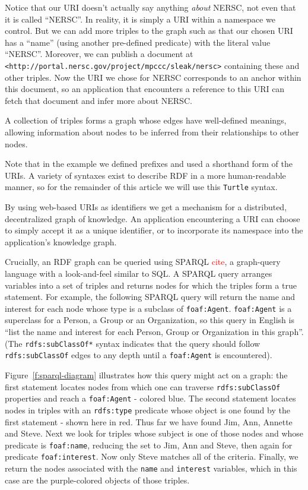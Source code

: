 Notice that our URI doesn't actually say anything \emph{about} NERSC, not even 
that it is called ``NERSC''. In reality, it is simply a URI within a 
namespace we control. But we can add more triples to the graph such as
that our chosen URI has a ``name'' (using another pre-defined predicate)
with the literal value ``NERSC''. Moreover, we can publish a document 
at \texttt{<http://portal.nersc.gov/project/mpccc/sleak/nersc>} containing 
these and other triples. Now the URI we chose for NERSC corresponds to an 
anchor within this document, so an application that encounters a reference 
to this URI can fetch that document and infer more about NERSC.

\begin{keypoint}
A collection of triples forms a graph whose edges have well-defined meanings, 
allowing information about nodes to be inferred from their relationships to 
other nodes.
\end{keypoint}

Note that in the example we defined prefixes and used a shorthand form of 
the URIs. A variety of syntaxes exist to describe RDF in a more human-readable
manner, so for the remainder of this article we will use this \texttt{Turtle}
syntax. 

By using web-based URIs as identifiers we get a mechanism for a distributed,
decentralized graph of knowledge. An application encountering a URI can 
choose to simply accept it as a unique identifier, or to incorporate its
namespace into the application's knowledge graph.

Crucially, an RDF graph can be queried using SPARQL \textcolor{red}{cite}, a
graph-query language with a look-and-feel similar to SQL. A SPARQL query 
arranges variables into a set of triples and returns nodes for which
the triples form a true statement. For example, the following SPARQL query
will return the name and interest for each node whose type is 
a subclass of \texttt{foaf:Agent}. \texttt{foaf:Agent} is a superclass for a Person, a 
Group or an Organization, so this query in English is ``list the name and 
interest for each Person, Group or Organization in this graph''. (The 
\texttt{rdfs:subClassOf*} syntax indicates that the query should follow 
\texttt{rdfs:subClassOf} edges to any depth until a \texttt{foaf:Agent} 
is encountered).

Figure~\ref{f:sparql-diagram} illustrates how this query might act on a graph: 
the first statement locates nodes from which one can traverse \texttt{rdfs:subClassOf} properties and reach a \texttt{foaf:Agent} - colored blue. The second statement 
locates nodes in triples with an \texttt{rdfs:type} predicate whose object 
is one found by the first statement - shown here in red. Thus far we have found Jim, 
Ann, Annette and Steve. Next we look for triples whose subject is one of those nodes
and whose predicate is \texttt{foaf:name}, reducing the set to Jim, Ann and Steve, then
again for predicate \texttt{foaf:interest}. Now only Steve matches all of the criteria.
Finally, we return the nodes associated with the \texttt{name} and \texttt{interest} 
variables, which in this case are the purple-colored objects of those triples.


